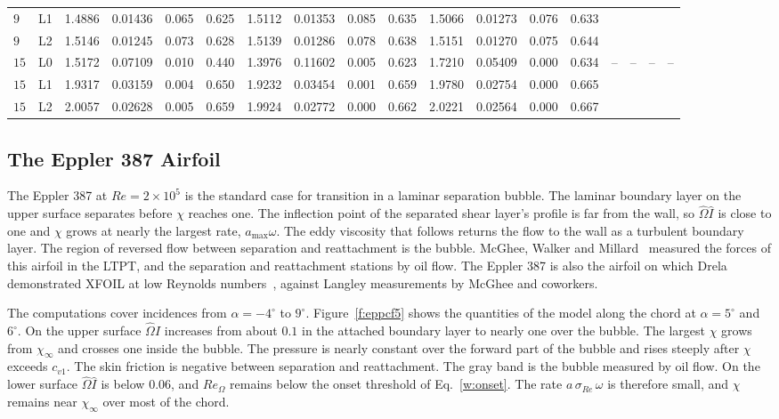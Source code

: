 \documentclass[conf]{new-aiaa}
\begin{document}
\begin{table}[!htbp]
\begin{tabular}{ll cccc cccc cccc cccc}
    $9$ & L1 & 1.4886 & 0.01436 & 0.065 & 0.625 & 1.5112 & 0.01353 & 0.085 & 0.635 & 1.5066 & 0.01273 & 0.076 & 0.633 &  &  &  &  \\
    $9$ & L2 & 1.5146 & 0.01245 & 0.073 & 0.628 & 1.5139 & 0.01286 & 0.078 & 0.638 & 1.5151 & 0.01270 & 0.075 & 0.644 &  &  &  &  \\
    \addlinespace
    $15$ & L0 & 1.5172 & 0.07109 & 0.010 & 0.440 & 1.3976 & 0.11602 & 0.005 & 0.623 & 1.7210 & 0.05409 & 0.000 & 0.634 & -- & -- & -- & -- \\
    $15$ & L1 & 1.9317 & 0.03159 & 0.004 & 0.650 & 1.9232 & 0.03454 & 0.001 & 0.659 & 1.9780 & 0.02754 & 0.000 & 0.665 &  &  &  &  \\
    $15$ & L2 & 2.0057 & 0.02628 & 0.005 & 0.659 & 1.9924 & 0.02772 & 0.000 & 0.662 & 2.0221 & 0.02564 & 0.000 & 0.667 &  &  &  &  \\
    \bottomrule
  \end{tabular}
\end{table}

\FloatBarrier
\subsection{The Eppler 387 Airfoil}

The Eppler 387 at $Re=2\times10^5$ is the standard case for transition in a
laminar separation bubble. The laminar boundary layer on the upper surface
separates before $\chi$ reaches one. The inflection point of the separated
shear layer's profile is far from the wall, so $\hat\Omega\hat I$ is close to
one and $\chi$ grows at nearly the largest rate, $a_{\max}\omega$. The eddy
viscosity that follows returns the flow to the wall as a turbulent boundary
layer. The region of reversed flow between separation and reattachment is the
bubble. McGhee, Walker and Millard~\cite{mcghee_1988} measured the forces of
this airfoil in the LTPT, and the separation and reattachment stations by oil
flow. The Eppler 387 is also the airfoil on which Drela demonstrated XFOIL at
low Reynolds numbers~\cite{drela_xfoil_1989}, against Langley measurements by
McGhee and coworkers.

The computations cover incidences from $\alpha=-4^\circ$ to $9^\circ$.
Figure~\ref{f:eppcf5} shows the quantities of the model along the chord at
$\alpha=5^\circ$ and $6^\circ$. On the upper surface $\hat\Omega\hat I$
increases from about $0.1$ in the attached boundary layer to nearly one over
the bubble. The largest $\chi$ grows from $\chi_\infty$ and crosses one
inside the bubble. The pressure is nearly constant over the forward part of
the bubble and rises steeply after $\chi$ exceeds $c_{v1}$. The skin friction
is negative between separation and reattachment. The gray band is the bubble
measured by oil flow. On the lower surface $\hat\Omega\hat I$ is below $0.06$,
and $Re_\Omega$ remains below the onset threshold of Eq.~\eqref{w:onset}. The
rate $a\,\sigma_{Re}\,\omega$ is therefore small, and $\chi$ remains near
$\chi_\infty$ over most of the chord.
\end{document}
